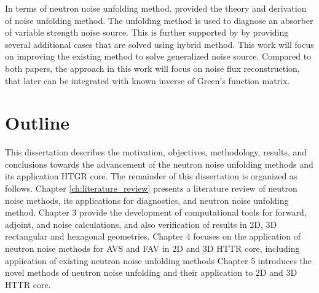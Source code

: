 In terms of neutron noise unfolding method, \cite{demaziereIdentificationLocalizationAbsorbers2005} provided the theory and derivation of noise unfolding method. The unfolding method is used to diagnose an absorber of variable strength noise source. This is further supported by \cite{hosseiniNoiseSourceReconstruction2014} by providing several additional cases that are solved using hybrid method. This work will focus on improving the existing method to solve generalized noise source. Compared to both papers, the approach in this work will focus on noise flux reconstruction, that later can be integrated with known inverse of Green’s function matrix.

\section{Outline}

This dissertation describes the motivation, objectives, methodology, results, and conclusions towards the advancement of the neutron noise unfolding methods and its application HTGR core.
The remainder of this dissertation is organized as follows.
Chapter \ref{ch:literature_review} presents a literature review of neutron noise methods, its applications for diagnostics, and neutron noise unfolding method.
Chapter 3 provide the development of computational tools for forward, adjoint, and noise calculations, and also verification of results in 2D, 3D rectangular and hexagonal geometries.
Chapter 4 focuses on the application of neutron noise methods for AVS and FAV in 2D and 3D HTTR core, including application of existing neutron noise unfolding methods
Chapter 5 introduces the novel methods of neutron noise unfolding and their application to 2D and 3D HTTR core.

% 
% 
% 
% 

